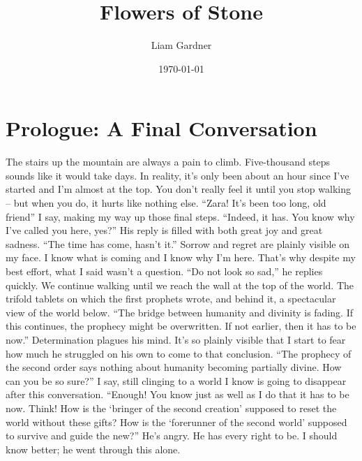 \documentclass[openany, 12pt]{book}
\title{Flowers of Stone}
\author{Liam Gardner}
\date{\today}
\newcommand\tab[1][1cm]{\hspace*{#1}}
\begin{document}
\maketitle
\tableofcontents
\chapter*{Prologue: A Final Conversation}
\tab
The stairs up the mountain are always a pain to climb. Five-thousand steps sounds like it would take days. In reality, it’s only been about an hour since I’ve started and I’m almost at the top.  You don’t really feel it until you stop walking – but when you do, it hurts like nothing else.
\newline
\tab
``Zara! It’s been too long, old friend” I say, making my way up those final steps.
\newline
\tab
``Indeed, it has. You know why I’ve called you here, yes?” His reply is filled with both great joy and great sadness.
\newline
\tab
``The time has come, hasn’t it.” Sorrow and regret are plainly visible on my face. I know what is coming and I know why I’m here. That’s why despite my best effort, what I said wasn’t a question.
\newline
\tab
``Do not look so sad,” he replies quickly.
\newline
\tab
We continue walking until we reach the wall at the top of the world. The trifold tablets on which the first prophets wrote, and behind it, a spectacular view of the world below.
\newline
\tab
``The bridge between humanity and divinity is fading. If this continues, the prophecy might be overwritten. If not earlier, then it has to be now.” Determination plagues his mind. It’s so plainly visible that I start to fear how much he struggled on his own to come to that conclusion.
\newline
\tab
``The prophecy of the second order says nothing about humanity becoming partially divine. How can you be so sure?” I say, still clinging to a world I know is going to disappear after this conversation.
\newline
\tab
``Enough! You know just as well as I do that it has to be now. Think! How is the `bringer of the second creation' supposed to reset the world without these gifts? How is the `forerunner of the second world' supposed to survive and guide the new?'' He's angry. He has every right to be. I should know better; he went through this alone.
\end{document}
